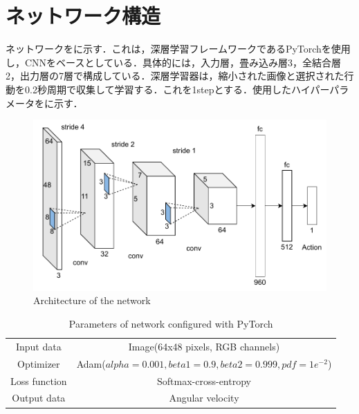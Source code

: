 
\section{ネットワーク構造}

  ネットワークをに示す．これは，深層学習フレームワークであるPyTorch\cite{pytorch}を使用し，CNNをベースとしている．具体的には，入力層，畳み込み層3，全結合層2，出力層の7層で構成している．深層学習器は，縮小された画像と選択された行動を0.2秒周期で収集して学習する．これを1stepとする．使用したハイパーパラメータをに示す．

  \begin{figure}[h]
    \centering
    \includegraphics[keepaspectratio, scale=0.60] {images/pdf/RobotGuidance_network}
    \caption{Architecture of the network}
    \label{Fig:RobotGuidance_network}
  \end{figure}

  \begin{table}[hbtp]
    \caption{Parameters of network configured with PyTorch}
    \label{tab:Parameters of network configured with pytorch}
    \centering
    \begin{tabular}{cc}
      \hline
      Input data & Image(64x48 pixels, RGB channels) \\
      Optimizer & Adam($alpha = 0.001, beta1 = 0.9, beta2 =  0.999, pdf = 1e^{-2}$)\\
      Loss function & Softmax-cross-entropy\\
      Output data & Angular velocity\\
      \hline
    \end{tabular}
  \end{table}

\newpage
